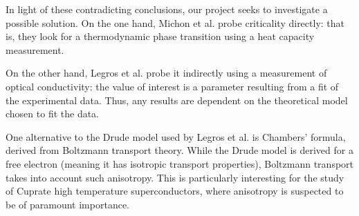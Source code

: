 In light of these contradicting conclusions, our project seeks to investigate a possible solution.
On the one hand, Michon et al. probe criticality directly: 
that is, they look for a thermodynamic phase transition using a heat capacity measurement.

On the other hand, Legros et al. probe it indirectly using a measurement of optical conductivity: 
the value of interest is a parameter resulting from a fit of the experimental data. 
Thus, any results are dependent on the theoretical model chosen to fit the data.

One alternative to the Drude model used by Legros et al. is Chambers' formula, 
derived from Boltzmann transport theory. 
While the Drude model is derived for a free electron 
(meaning it has isotropic transport properties), 
Boltzmann transport takes into account such anisotropy. 
This is particularly interesting for the study of Cuprate high temperature superconductors, 
where anisotropy is suspected to be of paramount importance.


